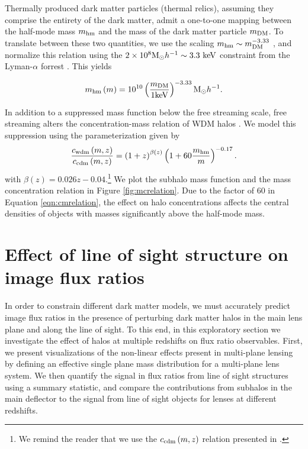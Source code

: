 Thermally produced dark matter particles (thermal relics), assuming they comprise the entirety of the dark matter, admit a one-to-one mapping between the half-mode mass $m_{\rm{hm}}$ and the mass of the dark matter particle $m_{\rm{DM}}$. To translate between these two quantities, we use the scaling $m_{\rm{hm}} \sim m_{\rm{DM}}^{-3.33}$ \cite{Schneider++12}, and normalize this relation using the $2\times 10^8 {\rm{M}_{\odot}} h^{-1} \sim 3.3 \ \rm{keV}$ constraint from the Lyman-$\alpha$ forrest \cite{Viel13}. This yields

\begin{equation}
\label{eqn:masskev}
m_{\rm{hm}}\left(m\right) = 10^{10} \left(\frac{m_{\rm{DM}}}{\rm{1keV}}\right)^{-3.33} {\rm{M}_{\odot}} h^{-1}.
\end{equation}

In addition to a suppressed mass function below the free streaming scale, free streaming alters the concentration-mass relation of WDM halos \cite{Schneider++12,Maccio++13,Bose++16,Ludlow++16}. We model this suppression using the parameterization given by \cite{Bose++16} 
\begin{equation}
\label{eqn:cmrelation}
\frac{c_{\rm{wdm}}\left(m, z\right)}{c_{\rm{cdm}}\left(m, z\right)} =  \left(1+z\right) ^{\beta\left(z\right)} \left(1+60\frac{m_{\rm{hm}}}{m}\right)^{-0.17}.
\end{equation}
with $\beta\left(z\right) = 0.026z - 0.04$.\footnote{We remind the reader that we use the $c_{\rm{cdm}}\left(m,z\right)$ relation presented in \cite{DiemerJoyce18}.} We plot the subhalo mass function and the mass concentration relation in Figure \ref{fig:mcrelation}. Due to the factor of 60 in Equation \ref{eqn:cmrelation}, the effect on halo concentrations affects the central densities of objects with masses significantly above the half-mode mass.  

\section{Effect of line of sight structure on image flux ratios}
\label{sec:multiplanelensing}
In order to constrain different dark matter models, we must accurately predict image flux ratios in the presence of perturbing dark matter halos in the main lens plane and along the line of sight. To this end, in this exploratory section we investigate the effect of halos at multiple redshifts on flux ratio observables. First, we present visualizations of the non-linear effects present in multi-plane lensing by defining an effective single plane mass distribution for a multi-plane lens system. We then quantify the signal in flux ratios from line of sight structures using a summary statistic, and compare the contributions from subhalos in the main deflector to the signal from line of sight objects for lenses at different redshifts.

